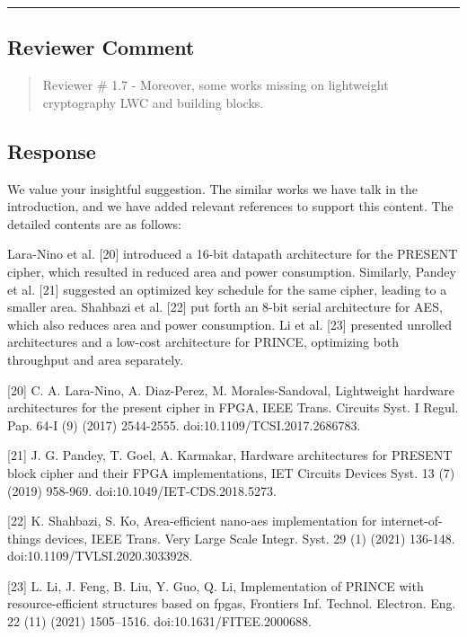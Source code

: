 \noindent\rule{\linewidth}{2.0pt}

\subsection{Reviewer Comment}
\begin{mdframed}
	\begin{quote}
		Reviewer \# 1.7 - Moreover, some works missing on lightweight cryptography LWC and building blocks.
	\end{quote}
\end{mdframed}

\subsection{Response}

We value your insightful suggestion. The similar works we have talk in the introduction, and we have added relevant references to support this content. The detailed contents are as follows:

\color{blue}

Lara-Nino et al. [20] introduced a 16-bit datapath architecture for the PRESENT cipher, which resulted in reduced area and power consumption. Similarly, Pandey et al. [21] suggested an optimized key schedule for the same cipher, leading to a smaller area. Shahbazi et al. [22] put forth an 8-bit serial architecture for AES, which also reduces area and power consumption. Li et al. [23] presented unrolled architectures and a low-cost architecture for PRINCE, optimizing both throughput and area separately.

	[20] C. A. Lara-Nino, A. Diaz-Perez, M. Morales-Sandoval, Lightweight hardware architectures for the present cipher in FPGA, IEEE Trans. Circuits Syst. I Regul. Pap. 64-I (9) (2017) 2544-2555. doi:10.1109/TCSI.2017.2686783.

[21] J. G. Pandey, T. Goel, A. Karmakar, Hardware architectures for PRESENT block cipher and their FPGA implementations, IET Circuits Devices Syst. 13 (7) (2019) 958-969. doi:10.1049/IET-CDS.2018.5273.

[22] K. Shahbazi, S. Ko, Area-efficient nano-aes implementation for internet-of-things devices, IEEE Trans. Very Large Scale Integr. Syst. 29 (1) (2021) 136-148. doi:10.1109/TVLSI.2020.3033928.

[23] L. Li, J. Feng, B. Liu, Y. Guo, Q. Li, Implementation of PRINCE with resource-efficient structures based on fpgas, Frontiers Inf. Technol. Electron. Eng. 22 (11) (2021) 1505–1516. doi:10.1631/FITEE.2000688.


